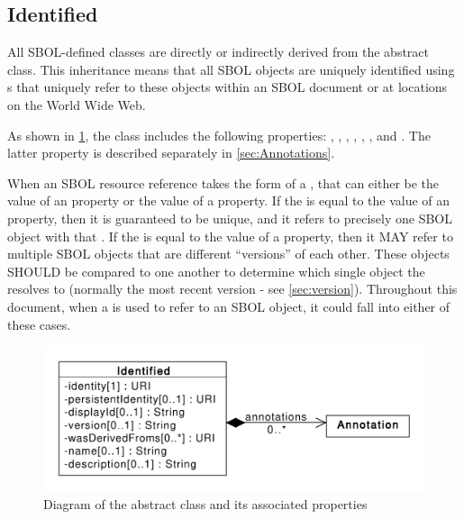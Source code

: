 \subsection{Identified}
\label{sec:Identified}

All SBOL-defined classes are directly or indirectly derived from the   abstract class.
This inheritance means that all SBOL objects are uniquely identified using s that uniquely refer to these objects within an SBOL document or at locations on the World Wide Web.

As shown in \ref{uml:identified}, the  class includes the following properties: , , , , , , and . The latter property is described separately in \ref{sec:Annotations}.

When an SBOL resource reference takes the form of a , that  can either be the value of an  property or the value of a  property.
If the  is equal to the value of an  property, then it is guaranteed to be unique, and it refers to precisely one SBOL object with that .
If the  is equal to the value of a  property, then it MAY refer to multiple SBOL objects that are different ``versions'' of each other. These objects SHOULD be compared to one another to determine which single object the  resolves to (normally the most recent version - see \ref{sec:version}).
Throughout this document, when a  is used to refer to an SBOL object, it could fall into either of these cases.

\begin{figure}[ht]
\begin{center}
\includegraphics[scale=0.6]{uml/identified}
\caption[]{Diagram of the  abstract class and its associated properties}
\label{uml:identified}
\end{center}
\end{figure}

